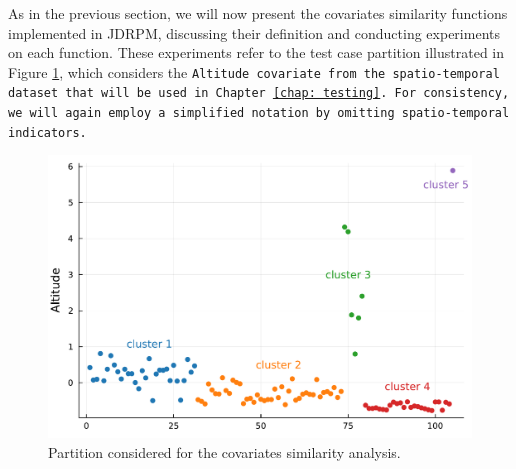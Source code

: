\documentclass[12pt,	%
	a4paper,		%
	twoside,		%
	openright,		%
	titlepage,%
	]{book}
\theoremstyle{definition}
\begin{document}
As in the previous section, we will now present the covariates similarity functions implemented in JDRPM, discussing their definition and conducting experiments on each function. These experiments refer to the test case partition illustrated in Figure \ref{fig: similarity tests}, which considers the \tt{Altitude} covariate from the spatio-temporal dataset that will be used in Chapter \ref{chap: testing}. For consistency, we will again employ a simplified notation by omitting spatio-temporal indicators.

\begin{figure}[ht!]
    \centering
    \includegraphics[width=1\linewidth]{model description/new cova plots/similarity_sorted_test.pdf}
    \caption[Partition considered for the covariates similarity analysis]{Partition considered for the covariates similarity analysis.}
    \label{fig: similarity tests}
\end{figure}
\end{document}
